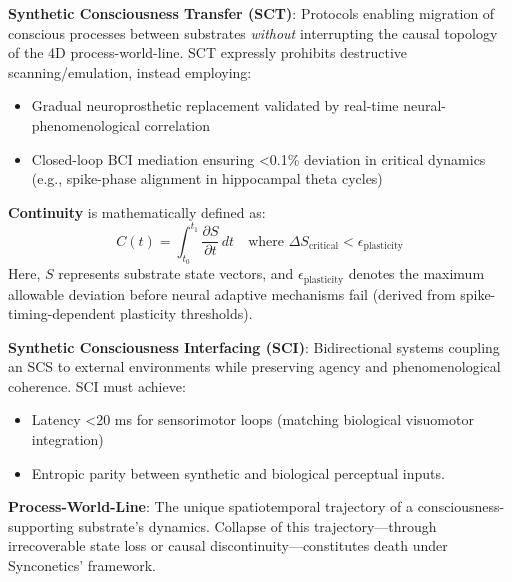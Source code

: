 \documentclass[10pt]{article}
\begin{document}
\begin{sloppypar}
  \textbf{Synthetic Consciousness Transfer (SCT)}: Protocols enabling migration of conscious processes between substrates \textit{without} interrupting the causal topology of the 4D process-world-line. SCT expressly prohibits destructive scanning/emulation, instead employing:
  \begin{itemize}
    \item Gradual neuroprosthetic replacement validated by real-time neural-phenomenological correlation
    \item Closed-loop BCI mediation ensuring <0.1\% deviation in critical dynamics (e.g., spike-phase alignment in hippocampal theta cycles)
  \end{itemize}
  \textbf{Continuity} is mathematically defined as:
  \begin{equation}
    C(t) = \int_{t_0}^{t_1} \frac{\partial S}{\partial t} \, dt \quad \text{where } \Delta S_{\text{critical}} < \epsilon_{\text{plasticity}}
  \end{equation}
  Here, \( S \) represents substrate state vectors, and \( \epsilon_{\text{plasticity}} \) denotes the maximum allowable deviation before neural adaptive mechanisms fail (derived from spike-timing-dependent plasticity thresholds).

  \textbf{Synthetic Consciousness Interfacing (SCI)}: Bidirectional systems coupling an SCS to external environments while preserving agency and phenomenological coherence. SCI must achieve:
  \begin{itemize}
    \item Latency <20 ms for sensorimotor loops (matching biological visuomotor integration)
    \item Entropic parity between synthetic and biological perceptual inputs.
  \end{itemize}

  \textbf{Process-World-Line}: The unique spatiotemporal trajectory of a consciousness-supporting substrate’s dynamics. Collapse of this trajectory—through irrecoverable state loss or causal discontinuity—constitutes death under Synconetics’ framework.


\end{sloppypar}
\end{document}
